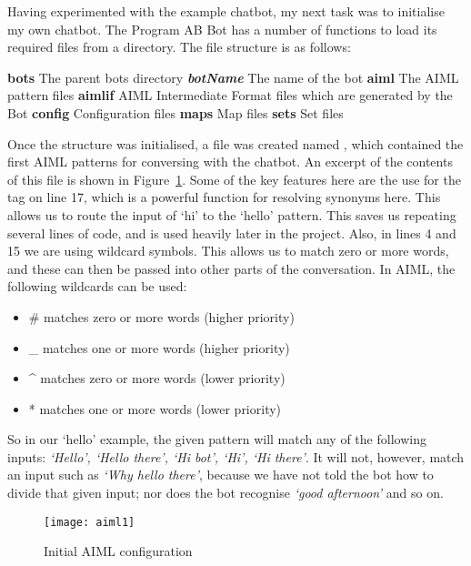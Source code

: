 \newpage
Having experimented with the example chatbot, my next task was to initialise my own chatbot. The Program AB Bot has a number of functions to load its required files from a directory. The file structure is as follows:

\begin{outline}
	\1 \textbf{bots} The parent bots directory
		\2 \textbf{\emph{botName}} The name of the bot
			\3 \textbf{aiml} The AIML pattern files 
			\3 \textbf{aimlif} AIML Intermediate Format files which are generated by the Bot
			\3 \textbf{config} Configuration files
			\3 \textbf{maps} Map files
			\3 \textbf{sets} Set files
\end{outline}
	
Once the structure was initialised, a file was created named , which contained the first AIML patterns for conversing with the chatbot. An excerpt of the contents of this file is shown in Figure~\ref{fig:aiml1}. Some of the key features here are the use for the  tag on line 17, which is a powerful function for resolving synonyms here. This allows us to route the input of `hi' to the `hello' pattern. This saves us repeating several lines of code, and is used heavily later in the project. Also, in lines 4 and 15 we are using wildcard symbols. This allows us to match zero or more words, and these can then be passed into other parts of the conversation. In AIML, the following wildcards can be used:

\begin{itemize}
	\item \# matches zero or more words (higher priority)
	\item \_ matches one or more words (higher priority)
	\item \^{} matches zero or more words (lower priority)
	\item * matches one or more words (lower priority)
\end{itemize}

So in our `hello' example, the given pattern will match any of the following inputs: {\it{`Hello', `Hello there', `Hi bot', `Hi', `Hi there'}}. It will not, however, match an input such as {\it{`Why hello there'}}, because we have not told the bot how to divide that given input; nor does the bot recognise {\it{`good afternoon'}} and so on.

\begin{figure}[h]
	\centering
	\texttt{[image: aiml1]}
	\caption{Initial AIML configuration}
	\label{fig:aiml1}
\end{figure}

